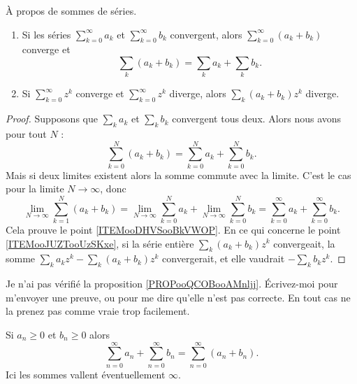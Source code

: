 \begin{proposition}     \label{PROPooUEBWooUQBQvP}
	À propos de sommes de séries.
	\begin{enumerate}
		\item		\label{ITEMooDHVSooBkVWOP}
		      Si les séries \( \sum_{k=0}^{\infty}a_k\) et \( \sum_{k=0}^{\infty}b_k\) convergent, alors \( \sum_{k=0}^{\infty}(a_k+b_k)\) converge et
		      \begin{equation}
			      \sum_k (a_k+b_k) = \sum_k a_k + \sum_k b_k.
		      \end{equation}
		\item	\label{ITEMooJUZTooUzSKxe}
		      Si \( \sum_{k=0}^{\infty}z^k\) converge et \( \sum_{k=0}^{\infty}z^k\) diverge, alors \( \sum_{k}(a_k+b_k)z^k\) diverge.
	\end{enumerate}
\end{proposition}

\begin{proof}
	Supposons que \( \sum_ka_k\) et \( \sum_kb_k\) convergent tous deux. Alors nous avons pour tout \( N\) :
	\begin{equation}
		\sum_{k=0}^N(a_k+b_k)=\sum_{k=0}^Na_k+\sum_{k=0}^Nb_k.
	\end{equation}
	Mais si deux limites existent alors la somme commute avec la limite. C'est le cas pour la limite \( N\to \infty\), donc
	\begin{equation}
		\lim_{N\to \infty} \sum_{k=1}^{N}(a_k+b_k)=\lim_{N\to \infty} \sum_{k=0}^{N}a_k+\lim_{N\to \infty} \sum_{k=0}^{N}b_k=\sum_{k=0}^{\infty}a_k+\sum_{k=0}^{\infty}b_k.
	\end{equation}
	Cela prouve le point \ref{ITEMooDHVSooBkVWOP}. En ce qui concerne le point \ref{ITEMooJUZTooUzSKxe}, si la série entière \( \sum_k(a_k+b_k)z^k\) convergeait, la somme \( \sum_ka_kz^k-\sum_k(a_k+b_k)z^k\) convergerait, et elle vaudrait \( -\sum_kb_kz^k\).
\end{proof}

\begin{probleme}
	Je n'ai pas vérifié la proposition \ref{PROPooQCOBooAMnljj}. Écrivez-moi pour m'envoyer une preuve, ou pour me dire qu'elle n'est pas correcte. En tout cas ne la prenez pas comme vraie trop facilement.
\end{probleme}

\begin{proposition}		\label{PROPooQCOBooAMnljj}
	Si \( a_n\geq 0\) et \( b_n\geq 0\) alors
	\begin{equation}
		\sum_{n=0}^{\infty}a_n+\sum_{n=0}^{\infty}b_n=\sum_{n=0}^{\infty}(a_n+b_n).
	\end{equation}
	Ici les sommes vallent éventuellement \( \infty\).
\end{proposition}


